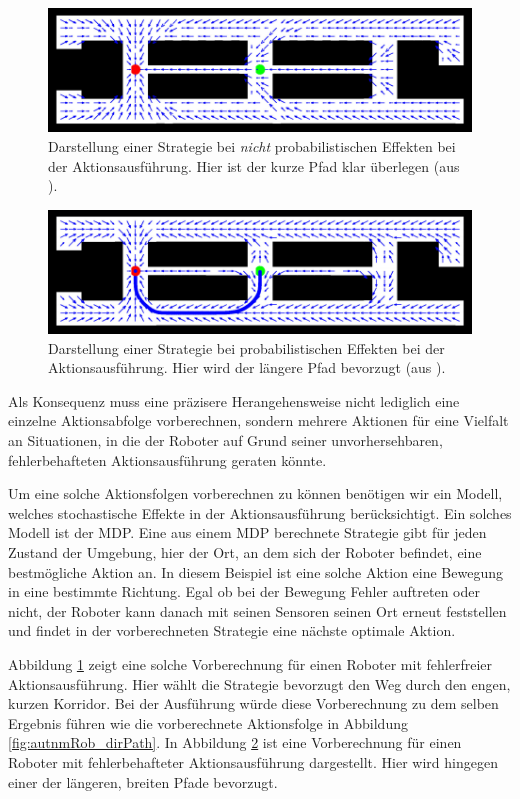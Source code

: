 \documentclass[a4paper]{IEEEtran}
\begin{document}
\begin{figure}[ht]
	\centering
	\includegraphics[scale=0.72]{images/autnmRobot_detActionMDP.png}
	\caption{Darstellung einer Strategie bei \emph{nicht} probabilistischen Effekten bei der Aktionsausführung. Hier ist der kurze Pfad klar überlegen (aus \cite{thrun2005probabilistic}).}
	\label{autnmRobot_detA}
\end{figure}
\begin{figure}
	\includegraphics[scale=0.72]{images/autnmRobot_ndetActionMDP.png}
	\caption{Darstellung einer Strategie bei probabilistischen Effekten bei der Aktionsausführung. Hier wird der längere Pfad bevorzugt (aus \cite{thrun2005probabilistic}).}
	\label{autnmRobot_ndetA}
\end{figure}

Als Konsequenz muss eine präzisere Herangehensweise nicht lediglich eine einzelne Aktionsabfolge vorberechnen, sondern mehrere Aktionen für eine Vielfalt an Situationen, in die der Roboter auf Grund seiner unvorhersehbaren, fehlerbehafteten Aktionsausführung geraten könnte.

Um eine solche Aktionsfolgen vorberechnen zu können benötigen wir ein Modell, welches stochastische Effekte in der Aktionsausführung berücksichtigt. Ein solches Modell ist der MDP. Eine aus einem MDP berechnete Strategie gibt für jeden Zustand der Umgebung, hier der Ort, an dem sich der Roboter befindet, eine bestmögliche Aktion an. In diesem Beispiel ist eine solche Aktion eine Bewegung in eine bestimmte Richtung. Egal ob bei der Bewegung Fehler auftreten oder nicht, der Roboter kann danach mit seinen Sensoren seinen Ort erneut feststellen und findet in der vorberechneten Strategie eine nächste optimale Aktion.

Abbildung \ref{autnmRobot_detA} zeigt eine solche Vorberechnung für einen Roboter mit fehlerfreier Aktionsausführung. Hier wählt die Strategie bevorzugt den Weg durch den engen, kurzen Korridor. Bei der Ausführung würde diese Vorberechnung zu dem selben Ergebnis führen wie die vorberechnete Aktionsfolge in Abbildung \ref{fig:autnmRob_dirPath}. In Abbildung \ref{autnmRobot_ndetA} ist eine Vorberechnung für einen Roboter mit fehlerbehafteter Aktionsausführung dargestellt. Hier wird hingegen einer der längeren, breiten Pfade bevorzugt.
\end{document}
